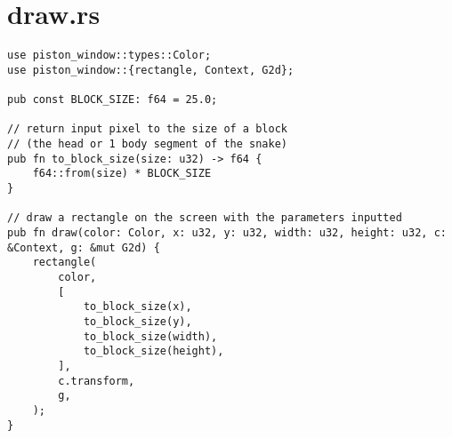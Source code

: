 \documentclass{article}
\begin{document}
\section{draw.rs}
\begin{verbatim}
use piston_window::types::Color;
use piston_window::{rectangle, Context, G2d};

pub const BLOCK_SIZE: f64 = 25.0;

// return input pixel to the size of a block
// (the head or 1 body segment of the snake)
pub fn to_block_size(size: u32) -> f64 {
    f64::from(size) * BLOCK_SIZE
}

// draw a rectangle on the screen with the parameters inputted
pub fn draw(color: Color, x: u32, y: u32, width: u32, height: u32, c: &Context, g: &mut G2d) {
    rectangle(
        color,
        [
            to_block_size(x),
            to_block_size(y),
            to_block_size(width),
            to_block_size(height),
        ],
        c.transform,
        g,
    );
}
\end{verbatim}
\end{document}
